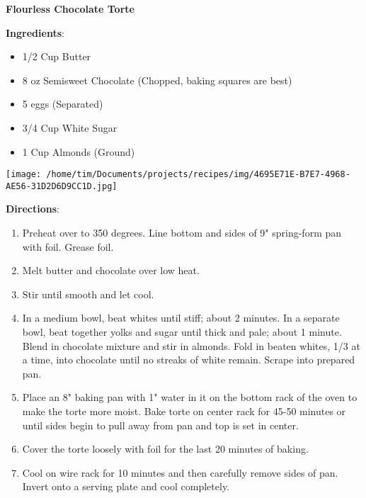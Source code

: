 \documentclass[11pt, twoside, openany]{book}
\begin{document}
\noindent\begin{minipage}[t]{\linewidth}%
{\Large\textbf{Flourless Chocolate Torte}} \label{flourless-chocolate-torte}\hfill\textit{}\\
\noindent\begin{minipage}[t]{0.78\linewidth}%
\textbf{Ingredients}:\vspace{-3mm}
\begin{multicols}{2}
\begin{itemize}\setlength\itemsep{-1mm}
\item 1/2 Cup Butter
\item 8 oz Semisweet Chocolate (Chopped, baking squares are best)
\item 5 eggs (Separated)
\item 3/4 Cup White Sugar
\item 1 Cup Almonds (Ground)
\end{itemize}
\end{multicols}
\end{minipage}
\noindent\begin{minipage}[t]{0.18\linewidth}
\centering \strut\vspace*{-\baselineskip}\newline
\texttt{[image: /home/tim/Documents/projects/recipes/img/4695E71E-B7E7-4968-AE56-31D2D6D9CC1D.jpg]}\\
\end{minipage}\vspace{3mm}
\textbf{Directions}:
\vspace{-3mm}\begin{enumerate}\setlength\itemsep{-1mm}
\item Preheat over to 350 degrees. Line bottom and sides of 9" spring-form pan with foil. Grease foil.
\item Melt butter and chocolate over low heat.
\item Stir until smooth and let cool.
\item In a medium bowl, beat whites until stiff; about 2 minutes. In a separate bowl, beat together yolks and sugar until thick and pale; about 1 minute. Blend in chocolate mixture and stir in almonds. Fold in beaten whites, 1/3 at a time, into chocolate until no streaks of white remain. Scrape into prepared pan.
\item Place an 8" baking pan with 1" water in it on the bottom rack of the oven to make the torte more moist. Bake torte on center rack for 45-50 minutes or until sides begin to pull away from pan and top is set in center.
\item Cover the torte loosely with foil for the last 20 minutes of baking.
\item Cool on wire rack for 10 minutes and then carefully remove sides of pan. Invert onto a serving plate and cool completely.
\end{enumerate}
\end{minipage}\vspace{8mm}
\end{document}
